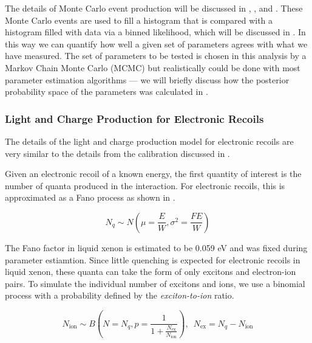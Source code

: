 The details of Monte Carlo event production will be discussed in , , and .  These Monte Carlo events are used to fill a histogram that is compared with a histogram filled with data via a binned likelihood, which will be discussed in .  In this way we can quantify how well a given set of parameters agrees with what we have measured.  The set of parameters to be tested is chosen in this analysis by a Markov Chain Monte Carlo (MCMC) but realistically could be done with most parameter estimation algorithms --- we will briefly discuss how the posterior probability space of the parameters was calculated in .
 

\subsubsection{Light and Charge Production for Electronic Recoils}
\label{sec:xe1t_mc_observables_production_er}

The details of the light and charge production model for electronic recoils are very similar to the details from the calibration discussed in .  

Given an electronic recoil of a known energy, the first quantity of interest is the number of quanta produced in the interaction.  For electronic recoils, this is approximated as a Fano process as shown in .

\begin{equation}
        \label{eqn:xe1t_er_fano}
        N_q \sim N \left( \mu = \frac{E}{W}, \sigma^2 = \frac{F E}{W} \right) 
\end{equation}

The Fano factor in liquid xenon is estimated to be 0.059 eV \cite{doke1976estimation} and was fixed during parameter estiamtion.  Since little quenching is expected for electronic recoils in liquid xenon, these quanta can take the form of only excitons and electron-ion pairs.   To simulate the individual number of excitons and ions, we use a binomial process with a probability defined by the \textit{exciton-to-ion} ratio.


\begin{equation}
        \label{eqn:xe1t_er_exciton_ion}
        N_{\textrm{ion}} \sim B \left( N=N_q, p = \frac{1}{1 + \frac{N_{\textrm{ex}}}{N_{\textrm{ion}}}} \right) , \, \, \, N_{\textrm{ex}} = N_q - N_{\textrm{ion}}
\end{equation}


